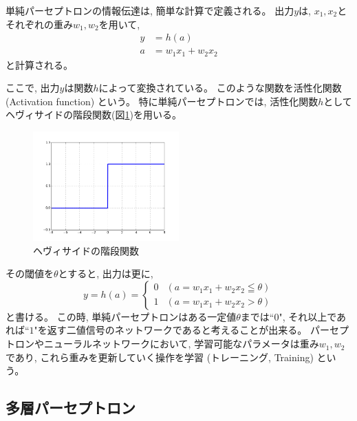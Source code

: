 単純パーセプトロンの情報伝達は, 簡単な計算で定義される。
出力$y$は, $x_1,x_2$とそれぞれの重み$w_1,w_2$を用いて, 
\begin{equation}
 \begin{split}
  y &= h(a)\\
  a &= w_1x_1 + w_2x_2
 \end{split}
\end{equation}
と計算される。

ここで, 出力$y$は関数$h$によって変換されている。
このような関数を活性化関数 (Activation function) という。
特に単純パーセプトロンでは, 活性化関数$h$としてヘヴィサイドの階段関数(図\ref{3HeavisideStepFunction})を用いる。

\begin{figure}[htbp]
 \centering
 \includegraphics[width=0.5\textwidth]{Figure/2DeepLearning/3HeavisideStepFunction.png}
 \caption{ヘヴィサイドの階段関数}
 \label{3HeavisideStepFunction}
\end{figure}

その閾値を$\theta$とすると, 出力は更に, 
\begin{equation}
 y = h(a) = \left\{ \begin{array}{ll}
    0 & (a = w_1x_1 + w_2x_2 \leqq \theta) \\
    1 & (a = w_1x_1 + w_2x_2 > \theta)
 \end{array} \right.
\end{equation}
と書ける。
この時, 単純パーセプトロンはある一定値$\theta$までは``$0$", それ以上であれば``$1$"を返す二値信号のネットワークであると考えることが出来る。
パーセプトロンやニューラルネットワークにおいて, 学習可能なパラメータは重み$w_1,w_2$であり, これら重みを更新していく操作を学習 (トレーニング, Training) という。


\subsection{多層パーセプトロン} \label{DL:Percep:MultiLayerPerceptron}

